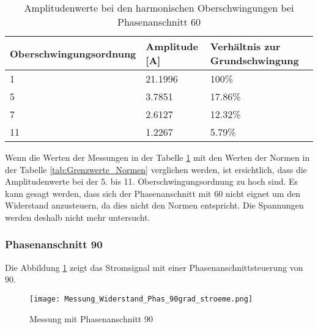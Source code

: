 \newpage
\begin{table}[ht!]
	\centering
	\begin{tabular}{|l|l|l|}
		\hline
		Oberschwingungsordnung & Amplitude [A] 	& Verhältnis zur Grundschwingung	\\ \hline
		1                      & 21.1996   		& 100\%								\\ \hline
		5                      & 3.7851    		& 17.86\%							\\ \hline
		7                      & 2.6127    		& 12.32\%							\\ \hline
		11                     & 1.2267    		& 5.79\%							\\ \hline
	\end{tabular}
	\caption{Amplitudenwerte bei den harmonischen Oberschwingungen bei Phasenanschnitt 60\textdegree}\label{tab:Phas_60_Stroeme}
\end{table}


Wenn die Werten der Messungen in der Tabelle \ref{tab:Phas_60_Stroeme} mit den Werten der Normen in der Tabelle \ref{tab:Grenzwerte_Normen} verglichen werden, ist ersichtlich, dass die Amplitudenwerte bei der 5. bis 11. Oberschwingungsordnung zu hoch sind. Es kann gesagt werden, dass sich der Phasenanschnitt mit 60\textdegree \hspace{0.02cm} nicht eignet um den Widerstand anzusteuern, da dies nicht den Normen entspricht. Die Spannungen werden deshalb nicht mehr untersucht. 


\subsubsection*{Phasenanschnitt 90\textdegree}

Die Abbildung \ref{fig:Mess_Widerstand_Phas_90grad_stroeme} zeigt das Stromsignal mit einer Phasenanschnittsteuerung von 90\textdegree \hspace{0.02cm}. 

\begin{figure}[ht!]
	\centering
	\texttt{[image: Messung\_Widerstand\_Phas\_90grad\_stroeme.png]}	
	\caption{Messung mit Phasenanschnitt 90\textdegree}\label{fig:Mess_Widerstand_Phas_90grad_stroeme}
\end{figure}

